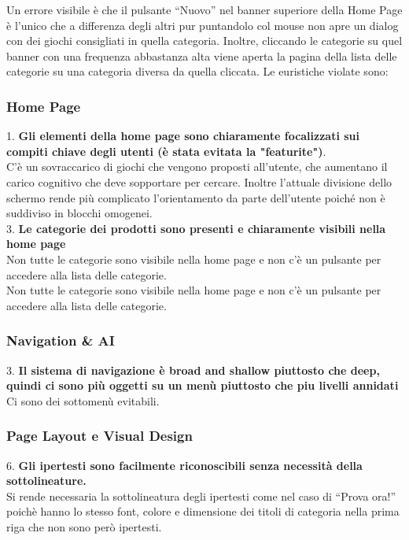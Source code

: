 \documentclass[../Report.tex]{subfiles}
\begin{document}
    Un errore visibile è che il pulsante “Nuovo” nel banner superiore della Home Page è l’unico che a differenza degli altri pur puntandolo col mouse non apre un dialog con dei giochi consigliati in quella categoria. Inoltre, cliccando le categorie su quel banner con una frequenza abbastanza alta viene aperta la pagina della lista delle categorie su una categoria diversa da quella cliccata. Le euristiche violate sono:

    \subsubsection{Home Page}
        1. \textbf{ Gli elementi della home page sono chiaramente focalizzati sui compiti chiave degli utenti (è stata evitata la "featurite")}.\\
        C’è un sovraccarico di giochi che vengono proposti all’utente, che aumentano il carico cognitivo che deve sopportare per cercare. Inoltre l’attuale divisione dello schermo rende più complicato l’orientamento da parte dell’utente poiché non è suddiviso in blocchi omogenei.\\

        3. \textbf{Le categorie dei prodotti sono presenti e chiaramente visibili nella home page}\\
        Non tutte le categorie sono visibile nella home page e non c’è un pulsante per accedere alla lista delle categorie.
\\ Non tutte le categorie sono visibile nella home page e non c’è un pulsante per accedere alla lista delle categorie.    
    \subsubsection{Navigation \& AI }
    3. \textbf{Il sistema di navigazione è broad and shallow piuttosto che deep, quindi ci sono più oggetti su un menù piuttosto che piu livelli annidati\\} 
 	Ci sono dei sottomenù evitabili. 

    \subsubsection{Page Layout e Visual Design}
    6. \textbf{Gli ipertesti sono facilmente riconoscibili senza necessità della sottolineature. }\\
    Si rende necessaria la sottolineatura degli ipertesti come nel caso di “Prova ora!” poichè hanno lo stesso font, colore e dimensione dei titoli di categoria nella prima riga che non sono però ipertesti. \\
\end{document}
